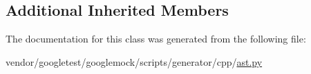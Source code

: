 \subsection*{Additional Inherited Members}


The documentation for this class was generated from the following file\+:\begin{DoxyCompactItemize}
\item 
vendor/googletest/googlemock/scripts/generator/cpp/\hyperlink{ast_8py}{ast.\+py}\end{DoxyCompactItemize}
